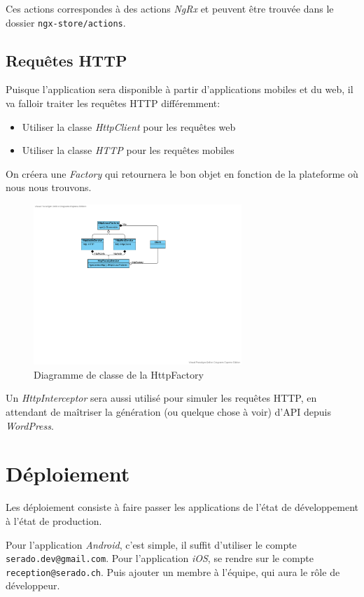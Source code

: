 \documentclass[french]{report}
\begin{document}
Ces actions correspondes à des actions \textit{NgRx} et peuvent être trouvée dans le dossier
\verb|ngx-store/actions|.

\section{Requêtes HTTP}
Puisque l'application sera disponible à partir d'applications mobiles et du web,
il va falloir traiter les requêtes HTTP différemment:
\begin{itemize}
    \item Utiliser la classe \textit{HttpClient} pour les requêtes web
    \item Utiliser la classe \textit{HTTP} pour les requêtes mobiles
\end{itemize}
On créera une \textit{Factory} qui retournera le bon objet en fonction de la
plateforme où nous nous trouvons.

\begin{figure}[H]
    \centering
    \includegraphics[width=0.7\textwidth]{../diags/http_factory_class.pdf}
    \caption{Diagramme de classe de la HttpFactory}
    \label{fig:class_http_factory}
\end{figure}

Un \textit{HttpInterceptor} sera aussi utilisé pour simuler les requêtes HTTP,
en attendant de maîtriser la génération (ou quelque chose à voir) d'API depuis
\textit{WordPress}.

\chapter{Déploiement}

Les déploiement consiste à faire passer les applications de l'état de développement
à l'état de production.

Pour l'application \textit{Android}, c'est simple, il suffit d'utiliser le compte
\verb|serado.dev@gmail.com|. Pour l'application \textit{iOS}, se rendre sur le compte
\verb|reception@serado.ch|. Puis ajouter un membre à l'équipe, qui aura le r\^ole de
développeur.
\end{document}
